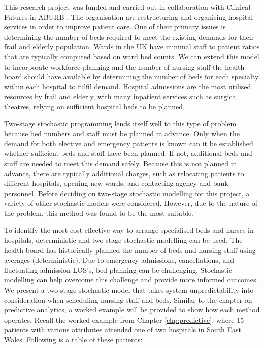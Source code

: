 \documentclass[../thesis.tex]{subfiles}
\begin{document}
This research project was funded and carried out in collaboration with Clinical Futures in ABUHB \cite{UniAneurinBevanHealthBoard2018}. The organisation are restructuring and organising hospital services in order to improve patient care. One of their primary issues is determining the number of beds required to meet the existing demands for their frail and elderly population. Wards in the UK have minimal staff to patient ratios that are typically computed based on ward bed counts. We can extend this model to incorporate workforce planning and the number of nursing staff the health board should have available by determining the number of beds for each specialty within each hospital to fulfil demand. Hospital admissions are the most utilised resources by frail and elderly, with many inpatient services such as surgical theatres, relying on sufficient hospital beds to be planned. 

Two-stage stochastic programming lends itself well to this type of problem because bed numbers and staff must be planned in advance. Only when the demand for both elective and emergency patients is known can it be established whether sufficient beds and staff have been planned. If not, additional beds and staff are needed to meet this demand safely. Because this is not planned in advance, there are typically additional charges, such as relocating patients to different hospitals, opening new wards, and contacting agency and bank personnel. Before deciding on two-stage stochastic modelling for this project, a variety of other stochastic models were considered, However, due to the nature of the problem, this method was found to be the most suitable.

To identify the most cost-effective way to arrange specialised beds and nurses in hospitals, deterministic and two-stage stochastic modelling can be used. The health board has historically planned the number of beds and nursing staff using averages (deterministic). Due to emergency admissions, cancellations, and fluctuating admission LOS's, bed planning can be challenging. Stochastic modelling can help overcome this challenge and provide more informed outcomes. We present a two-stage stochastic model that takes system unpredictability into consideration when scheduling nursing staff and beds. Similar to the chapter on predictive analytics, a worked example will be provided to show how each method operates. Recall the worked example from Chapter \ref{chp:predictive}, where 15 patients with various attributes attended one of two hospitals in South East Wales. Following is a table of these patients:
\end{document}
